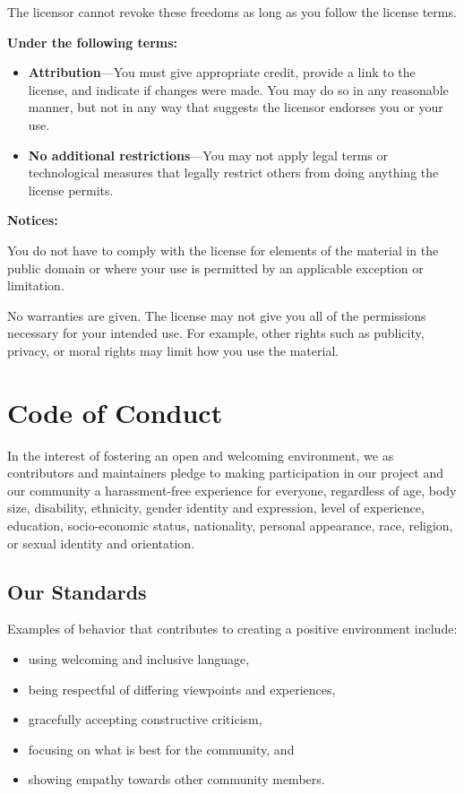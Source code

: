 \documentclass[]{Nemilov}
\providecommand{\tightlist}{%
  \setlength{\itemsep}{0pt}\setlength{\parskip}{0pt}}
\begin{document}
The licensor cannot revoke these freedoms as long as you follow the
license terms.

\textbf{Under the following terms:}

\begin{itemize}
\item
  \textbf{Attribution}---You must give appropriate credit, provide a link
  to the license, and indicate if changes were made. You may do so in
  any reasonable manner, but not in any way that suggests the licensor
  endorses you or your use.
\item
  \textbf{No additional restrictions}---You may not apply legal terms or
  technological measures that legally restrict others from doing
  anything the license permits.
\end{itemize}

\textbf{Notices:}

You do not have to comply with the license for elements of the
material in the public domain or where your use is permitted by an
applicable exception or limitation.

No warranties are given. The license may not give you all of the
permissions necessary for your intended use. For example, other rights
such as publicity, privacy, or moral rights may limit how you use the
material.

\hypertarget{conduct}{%
\chapter{Code of Conduct}\label{conduct}}

In the interest of fostering an open and welcoming environment, we as
contributors and maintainers pledge to making participation in our project and
our community a harassment-free experience for everyone, regardless of age, body
size, disability, ethnicity, gender identity and expression, level of
experience, education, socio-economic status, nationality, personal appearance,
race, religion, or sexual identity and orientation.

\hypertarget{conduct-standards}{%
\section{Our Standards}\label{conduct-standards}}

Examples of behavior that contributes to creating a positive environment
include:

\begin{itemize}
\tightlist
\item
  using welcoming and inclusive language,
\item
  being respectful of differing viewpoints and experiences,
\item
  gracefully accepting constructive criticism,
\item
  focusing on what is best for the community, and
\item
  showing empathy towards other community members.
\end{itemize}
\end{document}
